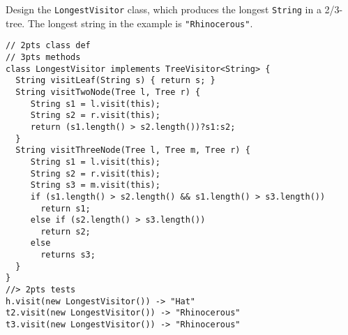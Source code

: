 \documentclass[12pt]{article}                   %
\newenvironment{solution}{\color{red}}{}
\begin{document}
\begin{problem}
\newpage

Design the \verb|LongestVisitor| class, which produces the longest
\verb|String| in a 2/3-tree.  The longest string in the example is
\verb|"Rhinocerous"|.  

\begin{solution}
\begin{verbatim}
// 2pts class def
// 3pts methods
class LongestVisitor implements TreeVisitor<String> {
  String visitLeaf(String s) { return s; }
  String visitTwoNode(Tree l, Tree r) { 
     String s1 = l.visit(this);
     String s2 = r.visit(this);
     return (s1.length() > s2.length())?s1:s2;
  }
  String visitThreeNode(Tree l, Tree m, Tree r) { 
     String s1 = l.visit(this);
     String s2 = r.visit(this);
     String s3 = m.visit(this);
     if (s1.length() > s2.length() && s1.length() > s3.length())
       return s1;
     else if (s2.length() > s3.length())
       return s2;
     else
       returns s3;
  }
}
//> 2pts tests
h.visit(new LongestVisitor()) -> "Hat"
t2.visit(new LongestVisitor()) -> "Rhinocerous"
t3.visit(new LongestVisitor()) -> "Rhinocerous"
\end{verbatim}
\end{solution}

\newpage

\end{problem}
\end{document}
